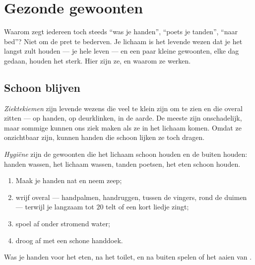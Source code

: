 \chapter{Gezonde gewoonten}\label{ch:g1:healthy-habits}

Waarom zegt iedereen toch steeds ``was je handen'', ``poets je tanden'',
``naar bed''? Niet om de pret te bederven. Je lichaam is het levende
wezen dat je het langst zult houden --- je hele leven --- en een paar
kleine gewoonten, elke dag gedaan, houden het sterk. Hier zijn ze, en
waarom ze werken.

\section{Schoon blijven}

\begin{definition}[Ziektekiemen]\label{def:g1:healthy-habits:germs}
\emph{Ziektekiemen} zijn levende wezens die veel te
klein zijn om te zien en die overal zitten --- op handen, op
deurklinken, in de aarde. De meeste zijn onschadelijk, maar sommige
kunnen ons ziek maken als ze in het lichaam komen. Omdat ze onzichtbaar
zijn, kunnen handen die schoon lijken ze toch dragen.
\end{definition}

\begin{definition}[Hygiëne]\label{def:g1:healthy-habits:hygiene}
\emph{Hygiëne} zijn de gewoonten die het lichaam schoon
houden en de  buiten houden: handen wassen, het lichaam
wassen, tanden poetsen, het eten schoon houden.
\end{definition}

\begin{method}\label{met:g1:healthy-habits:hands}
\begin{enumerate}
  \item Maak je handen nat en neem zeep;
  \item wrijf overal --- handpalmen, handruggen, tussen de vingers,
        rond de duimen --- terwijl je langzaam tot $20$ telt of een
        kort liedje zingt;
  \item spoel af onder stromend water;
  \item droog af met een schone handdoek.
\end{enumerate}
Was je handen voor het eten, na het toilet, en na buiten spelen of het
aaien van .
\end{method}

